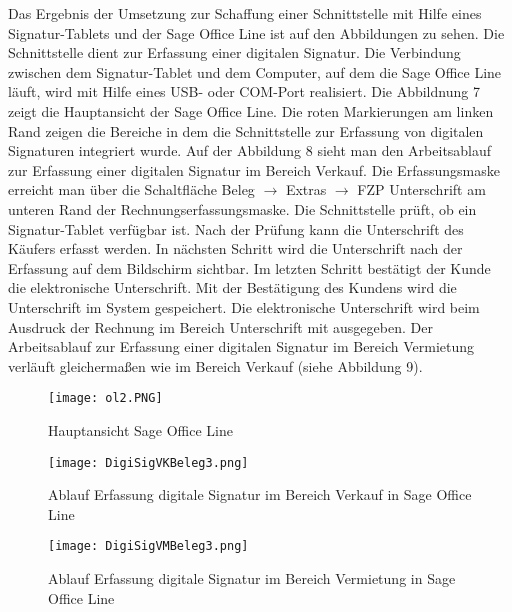 Das Ergebnis der Umsetzung zur Schaffung einer Schnittstelle mit 
Hilfe eines Signatur-Tablets und der Sage Office Line ist auf den 
Abbildungen zu sehen. Die Schnittstelle dient zur Erfassung einer 
digitalen Signatur. Die Verbindung zwischen dem Signatur-Tablet 
und dem Computer, auf dem die Sage Office Line läuft, wird mit 
Hilfe eines USB- oder COM-Port realisiert. Die Abbildnung 7 zeigt 
die Hauptansicht der Sage Office Line. Die roten Markierungen am 
linken Rand zeigen die Bereiche in dem die Schnittstelle zur Erfassung 
von digitalen Signaturen integriert wurde. Auf der Abbildung 8 
sieht man den Arbeitsablauf zur Erfassung einer digitalen Signatur 
im Bereich Verkauf. Die Erfassungsmaske erreicht man über die 
Schaltfläche Beleg $\rightarrow$ Extras $\rightarrow$ FZP Unterschrift 
am unteren Rand der Rechnungserfassungsmaske. Die Schnittstelle 
prüft, ob ein Signatur-Tablet verfügbar ist. Nach der Prüfung kann 
die Unterschrift des Käufers erfasst werden. In nächsten Schritt 
wird die Unterschrift nach der Erfassung auf dem Bildschirm sichtbar. 
Im letzten Schritt bestätigt der Kunde die elektronische Unterschrift. 
Mit der Bestätigung des Kundens wird die Unterschrift im System 
gespeichert. Die elektronische Unterschrift wird beim Ausdruck 
der Rechnung im Bereich Unterschrift mit ausgegeben. Der Arbeitsablauf 
zur Erfassung einer digitalen Signatur im Bereich Vermietung verläuft 
gleichermaßen wie im Bereich Verkauf (siehe Abbildung 9).

\begin{figure}[!ht]
    \centering
    \texttt{[image: ol2.PNG]}
    \caption[Hauptansicht Sage Office Line]{\small{Hauptansicht Sage Office Line}}
\end{figure}

\begin{figure}[!ht]
    \centering
    \texttt{[image: DigiSigVKBeleg3.png]}
    \caption[Ablauf Erfassung digitale Signatur in Sage Office Line (Verkauf)]{\small{Ablauf Erfassung digitale Signatur im Bereich Verkauf in Sage Office Line}}
\end{figure}

\begin{figure}[!ht]
    \centering
    \texttt{[image: DigiSigVMBeleg3.png]}
    \caption[Ablauf Erfassung digitale Signatur in Sage Office Line (Vermietung)]{\small{Ablauf Erfassung digitale Signatur im Bereich Vermietung in Sage Office Line}}
\end{figure}